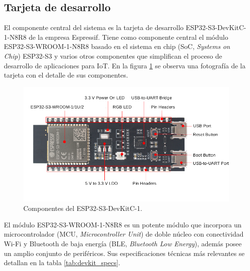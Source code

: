 \subsection{Tarjeta de desarrollo}
El componente central del sistema es la tarjeta de desarrollo ESP32-S3-DevKitC-1-N8R8 de la empresa Espressif. Tiene como componente central el módulo ESP32-S3-WROOM-1-N8R8 basado en el sistema en chip (SoC, \textit{Systems on Chip}) ESP32-S3 y varios otros componentes que simplifican el proceso de desarrollo de aplicaciones para IoT. En la figura \ref{fig:devkit_comp} se observa una fotografía de la tarjeta con el detalle de sus componentes.

\begin{figure}[h]
	\centering
	\includegraphics[scale=0.45]{./Figures/devkit_comp.png}
	\caption{Componentes del ESP32-S3-DevKitC-1\protect\footnotemark.}
	\label{fig:devkit_comp}
\end{figure}

El módulo ESP32-S3-WROOM-1-N8R8 es un potente módulo que incorpora un microcontrolador (MCU, \textit{Microcontroller Unit}) de doble núcleo con conectividad Wi-Fi y Bluetooth de baja energía (BLE, \textit{Bluetooth Low Energy}), además posee un amplio conjunto de periféricos. Sus especificaciones técnicas más relevantes se detallan en la tabla \ref{tab:devkit_specs}.

